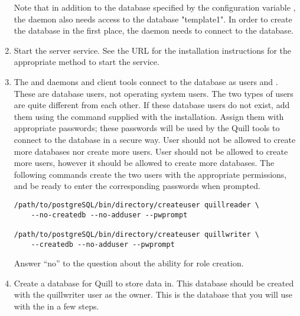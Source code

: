 \begin{enumerate}
Note that in addition to the database specified by
the configuration variable ,
the  daemon also needs access to the database
"template1".
In order to create the database in the first place, 
the  daemon needs to connect to the database.

\item Start the  server service. See the URL for the
installation instructions for the appropriate method to start the service.

\item The  and  daemons and client tools connect
to the database as users  and 
.
These are database users, not operating system users.
The two types of users are quite different from each other.
If these database users do not exist,
add them using the 
 command supplied with the installation.
Assign them with appropriate passwords;
these passwords will be used by the Quill tools to connect
to the database in a secure way.
User  should not be allowed to create
more databases nor create more users.
User  should
not be allowed to create more users,
however it should be allowed to create more databases.
The following commands create the two users
with the appropriate permissions,
and be ready to enter the corresponding passwords when prompted.

\footnotesize
\begin{verbatim}
/path/to/postgreSQL/bin/directory/createuser quillreader \
	--no-createdb --no-adduser --pwprompt

/path/to/postgreSQL/bin/directory/createuser quillwriter \
	--createdb --no-adduser --pwprompt
\end{verbatim}
\normalsize

Answer ``no'' to the question about the ability for role creation.

\item Create a database for Quill to store data in. 
This database should be created with the quillwriter user as the owner.
This is the database that you will use with the 
in a few steps.


\end{enumerate}
